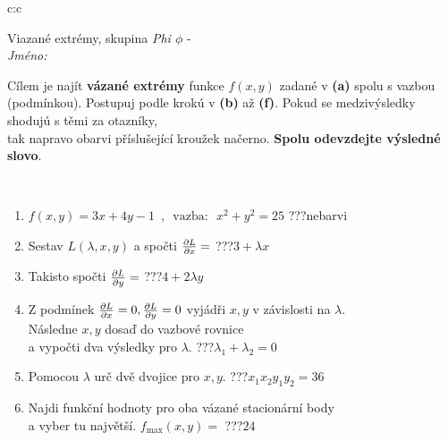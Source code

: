\documentclass[10pt]{report}
\begin{document}
\begin{tabular}{c:c}
\begin{minipage}[c][104.5mm][t]{0.5\linewidth}
\begin{center}
\vspace{7mm}
{\huge Viazané extrémy, skupina \textit{Phi $\phi$} -}\\[5mm]
\textit{Jméno:}\phantom{xxxxxxxxxxxxxxxxxxxxxxxxxxxxxxxxxxxxxxxxxxxxxxxxxxxxxxxxxxxxxxxxx}\\[5mm]
\begin{minipage}{0.95\linewidth}
\begin{center}
Cílem je najít \textbf{vázané extrémy} funkce $f(x,y)$ zadané v \textbf{(a)} spolu s vazbou (podmínkou). Postupuj podle krokú v \textbf{(b)} až \textbf{(f)}. Pokud se medzivýsledky shodujú s těmi za otazníky,\\tak napravo obarvi příslušející kroužek načerno. \textbf{Spolu odevzdejte výsledné slovo}.
\end{center}
\end{minipage}
\\[1mm]
\begin{minipage}{0.79\linewidth}
\begin{center}
\begin{varwidth}{\linewidth}
\begin{enumerate}
\normalsize
\item $f(x,y)=3x+4y-1 \enspace , \enspace \mathrm{vazba:} \enspace x^2+y^2=25$\quad \dotfill\; ???\;\dotfill \quad nebarvi
\item Sestav $L(\lambda,x,y)$ a spočti $\pdv{L}{x}=$\quad \dotfill\; ???\;\dotfill \quad $3+\lambda x$
\item Takisto spočti $\pdv{L}{y}=$\quad \dotfill\; ???\;\dotfill \quad $4+2\lambda y$
\item Z podmínek $\pdv{L}{x}=0 , \pdv{L}{y}=0$ vyjádři $x,y$ v závislosti na $\lambda$.\\ \phantom{xxxxxx}Následne $x,y$ dosaď do vazbové rovnice\\ \phantom{xxxxxx}a vypočti dva výsledky pro $\lambda$.\quad \dotfill\; ???\;\dotfill \quad $\lambda_1+\lambda_2=0$
\item Pomocou $\lambda$ urč dvě dvojice pro $x,y$.\quad \dotfill\; ???\;\dotfill \quad $x_1 x_2 y_1 y_2=36$
\item Najdi funkční hodnoty pro oba vázané stacionární body\\ \phantom{xxxxxx}a vyber tu najvětší. $f_{\text{max}}(x,y)=$\quad \dotfill\; ???\;\dotfill \quad $24$

\end{enumerate}
\end{varwidth}
\end{center}
\end{minipage}
\end{center}
\end{minipage}
\end{tabular}
\end{document}
